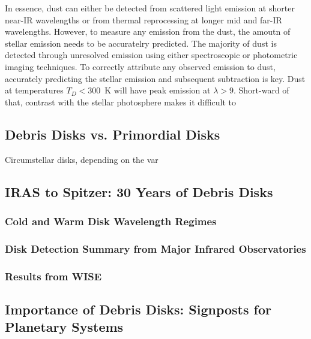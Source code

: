         In essence, dust can either be detected from scattered light emission at shorter near-IR wavelengths or from thermal reprocessing at longer mid and far-IR wavelengths. However, to measure any emission from the dust, the amoutn of stellar emission needs to be accuratelry predicted. The majority of dust is detected through unresolved emission using either spectroscopic or photometric imaging techniques. To correctly attribute any observed emission to dust, accurately predicting the stellar emission and subsequent subtraction is key.  Dust at temperatures $T_D<300$~K will have peak emission at $\lambda>9$\micron. Short-ward of that, contrast with the stellar photosphere makes it difficult to 
            
            
            
    \subsection{Debris Disks vs. Primordial Disks}        
        
        Circumstellar disks, depending on the var
        
        
    \subsection{IRAS to Spitzer: 30 Years of Debris Disks}\label{sec:30years}
    
        \subsubsection{Cold and Warm Disk Wavelength Regimes}

        \subsubsection{Disk Detection Summary from Major Infrared Observatories}\label{sec:IR_observatories}
        
        \subsubsection{Results from WISE}\label{sec:past_wise}
        
        
    \subsection{Importance of Debris Disks: Signposts for Planetary Systems}
        
